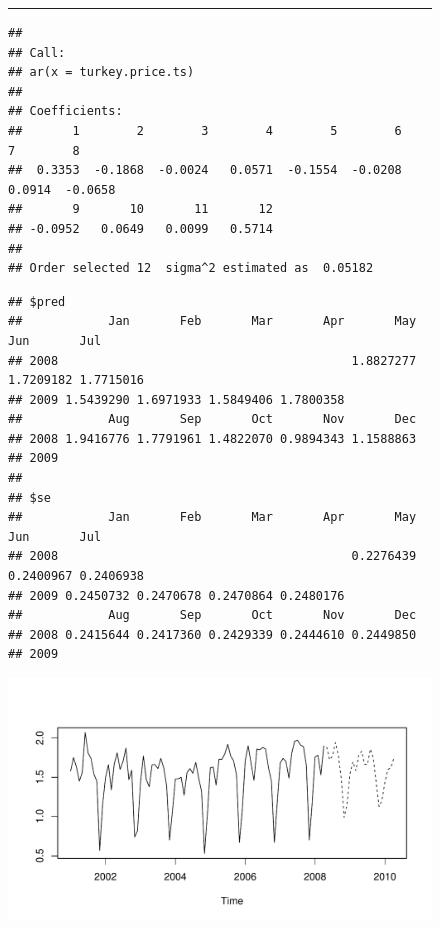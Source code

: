 \documentclass[11pt, letterpaper, twoside]{memoir}\usepackage{knitr}
\begin{document}
\begin{figure}
\centering
\rule{4in}{1pt}
\begin{knitrout}
\color{fgcolor}\begin{kframe}
\begin{alltt}
  
 \hlkwb{<-}  
\end{alltt}
\begin{verbatim}
## 
## Call:
## ar(x = turkey.price.ts)
## 
## Coefficients:
##       1        2        3        4        5        6        7        8  
##  0.3353  -0.1868  -0.0024   0.0571  -0.1554  -0.0208   0.0914  -0.0658  
##       9       10       11       12  
## -0.0952   0.0649   0.0099   0.5714  
## 
## Order selected 12  sigma^2 estimated as  0.05182
\end{verbatim}
\begin{alltt}
 \hlstd{=}\hlstd{)} 
\end{alltt}
\begin{verbatim}
## $pred
##            Jan       Feb       Mar       Apr       May       Jun       Jul
## 2008                                         1.8827277 1.7209182 1.7715016
## 2009 1.5439290 1.6971933 1.5849406 1.7800358                              
##            Aug       Sep       Oct       Nov       Dec
## 2008 1.9416776 1.7791961 1.4822070 0.9894343 1.1588863
## 2009                                                  
## 
## $se
##            Jan       Feb       Mar       Apr       May       Jun       Jul
## 2008                                         0.2276439 0.2400967 0.2406938
## 2009 0.2450732 0.2470678 0.2470864 0.2480176                              
##            Aug       Sep       Oct       Nov       Dec
## 2008 0.2415644 0.2417360 0.2429339 0.2444610 0.2449850
## 2009
\end{verbatim}
\begin{alltt}
   \hlstd{=} \hlstd{)}\hlopt{$} \hlstd{=}\hlstd{(}\hlopt{:}\hlstd{))}
\end{alltt}
\end{kframe}
\includegraphics[width=\maxwidth]{figure/unnamed-chunk-114-1} 


\end{knitrout}
\end{figure}
\end{document}

